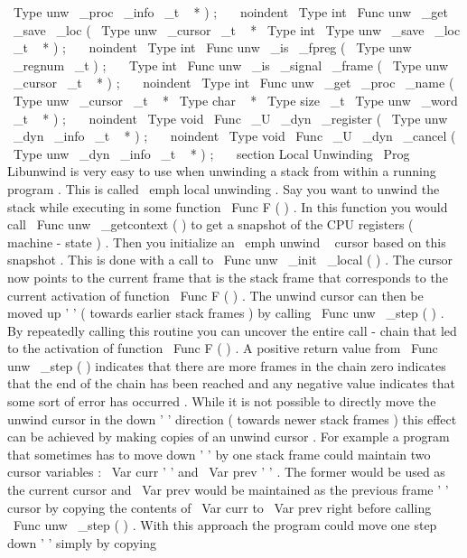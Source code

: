 \
Type
{
unw
\
_proc
\
_info
\
_t
~
*
}
)
;
\
\
\
noindent
\
Type
{
int
}
\
Func
{
unw
\
_get
\
_save
\
_loc
}
(
\
Type
{
unw
\
_cursor
\
_t
~
*
}
\
Type
{
int
}
\
Type
{
unw
\
_save
\
_loc
\
_t
~
*
}
)
;
\
\
\
noindent
\
Type
{
int
}
\
Func
{
unw
\
_is
\
_fpreg
}
(
\
Type
{
unw
\
_regnum
\
_t
}
)
;
\
\
\
Type
{
int
}
\
Func
{
unw
\
_is
\
_signal
\
_frame
}
(
\
Type
{
unw
\
_cursor
\
_t
~
*
}
)
;
\
\
\
noindent
\
Type
{
int
}
\
Func
{
unw
\
_get
\
_proc
\
_name
}
(
\
Type
{
unw
\
_cursor
\
_t
~
*
}
\
Type
{
char
~
*
}
\
Type
{
size
\
_t
}
\
Type
{
unw
\
_word
\
_t
~
*
}
)
;
\
\
\
noindent
\
Type
{
void
}
\
Func
{
\
_U
\
_dyn
\
_register
}
(
\
Type
{
unw
\
_dyn
\
_info
\
_t
~
*
}
)
;
\
\
\
noindent
\
Type
{
void
}
\
Func
{
\
_U
\
_dyn
\
_cancel
}
(
\
Type
{
unw
\
_dyn
\
_info
\
_t
~
*
}
)
;
\
\
\
section
{
Local
Unwinding
}
\
Prog
{
Libunwind
}
is
very
easy
to
use
when
unwinding
a
stack
from
within
a
running
program
.
This
is
called
\
emph
{
local
}
unwinding
.
Say
you
want
to
unwind
the
stack
while
executing
in
some
function
\
Func
{
F
}
(
)
.
In
this
function
you
would
call
\
Func
{
unw
\
_getcontext
}
(
)
to
get
a
snapshot
of
the
CPU
registers
(
machine
-
state
)
.
Then
you
initialize
an
\
emph
{
unwind
~
cursor
}
based
on
this
snapshot
.
This
is
done
with
a
call
to
\
Func
{
unw
\
_init
\
_local
}
(
)
.
The
cursor
now
points
to
the
current
frame
that
is
the
stack
frame
that
corresponds
to
the
current
activation
of
function
\
Func
{
F
}
(
)
.
The
unwind
cursor
can
then
be
moved
up
'
'
(
towards
earlier
stack
frames
)
by
calling
\
Func
{
unw
\
_step
}
(
)
.
By
repeatedly
calling
this
routine
you
can
uncover
the
entire
call
-
chain
that
led
to
the
activation
of
function
\
Func
{
F
}
(
)
.
A
positive
return
value
from
\
Func
{
unw
\
_step
}
(
)
indicates
that
there
are
more
frames
in
the
chain
zero
indicates
that
the
end
of
the
chain
has
been
reached
and
any
negative
value
indicates
that
some
sort
of
error
has
occurred
.
While
it
is
not
possible
to
directly
move
the
unwind
cursor
in
the
down
'
'
direction
(
towards
newer
stack
frames
)
this
effect
can
be
achieved
by
making
copies
of
an
unwind
cursor
.
For
example
a
program
that
sometimes
has
to
move
down
'
'
by
one
stack
frame
could
maintain
two
cursor
variables
:
\
Var
{
curr
}
'
'
and
\
Var
{
prev
}
'
'
.
The
former
would
be
used
as
the
current
cursor
and
\
Var
{
prev
}
would
be
maintained
as
the
previous
frame
'
'
cursor
by
copying
the
contents
of
\
Var
{
curr
}
to
\
Var
{
prev
}
right
before
calling
\
Func
{
unw
\
_step
}
(
)
.
With
this
approach
the
program
could
move
one
step
down
'
'
simply
by
copying
